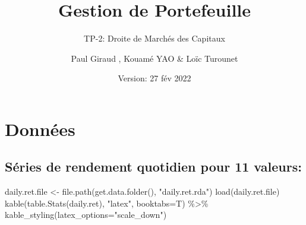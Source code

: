 \documentclass[
]{article}
\title{Gestion de Portefeuille}
\subtitle{TP-2: Droite de Marchés des Capitaux}
\author{Paul Giraud , Kouamé YAO \& Loïc Turounet}
\date{Version: 27 fév 2022}
\newenvironment{Shaded}{\begin{snugshade}}{\end{snugshade}}
\newcommand{\AttributeTok}[1]{\textcolor[rgb]{0.77,0.63,0.00}{#1}}
\newcommand{\FunctionTok}[1]{\textcolor[rgb]{0.00,0.00,0.00}{#1}}
\newcommand{\NormalTok}[1]{#1}
\newcommand{\OtherTok}[1]{\textcolor[rgb]{0.56,0.35,0.01}{#1}}
\newcommand{\SpecialCharTok}[1]{\textcolor[rgb]{0.00,0.00,0.00}{#1}}
\newcommand{\StringTok}[1]{\textcolor[rgb]{0.31,0.60,0.02}{#1}}
\begin{document}
\maketitle

\hypertarget{donnuxe9es}{%
\section{Données}\label{donnuxe9es}}

\hypertarget{suxe9ries-de-rendement-quotidien-pour-11-valeurs}{%
\subsection{Séries de rendement quotidien pour 11
valeurs:}\label{suxe9ries-de-rendement-quotidien-pour-11-valeurs}}

\begin{Shaded}
\begin{Highlighting}[]
\NormalTok{daily.ret.file }\OtherTok{\textless{}{-}} \FunctionTok{file.path}\NormalTok{(}\FunctionTok{get.data.folder}\NormalTok{(), }\StringTok{"daily.ret.rda"}\NormalTok{)}
\FunctionTok{load}\NormalTok{(daily.ret.file)}
\FunctionTok{kable}\NormalTok{(}\FunctionTok{table.Stats}\NormalTok{(daily.ret), }\StringTok{"latex"}\NormalTok{, }\AttributeTok{booktabs=}\NormalTok{T) }\SpecialCharTok{\%\textgreater{}\%} \FunctionTok{kable\_styling}\NormalTok{(}\AttributeTok{latex\_options=}\StringTok{"scale\_down"}\NormalTok{)}
\end{Highlighting}
\end{Shaded}
\end{document}
